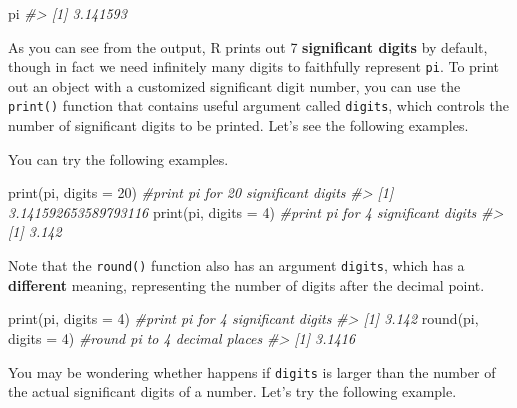 \documentclass[
]{book}
\newenvironment{Shaded}{\begin{snugshade}}{\end{snugshade}}
\newcommand{\AttributeTok}[1]{\textcolor[rgb]{0.77,0.63,0.00}{#1}}
\newcommand{\CommentTok}[1]{\textcolor[rgb]{0.56,0.35,0.01}{\textit{#1}}}
\newcommand{\DecValTok}[1]{\textcolor[rgb]{0.00,0.00,0.81}{#1}}
\newcommand{\FunctionTok}[1]{\textcolor[rgb]{0.00,0.00,0.00}{#1}}
\newcommand{\NormalTok}[1]{#1}
\newenvironment{blackbox}{
  \definecolor{shadecolor}{rgb}{0, 0, 0}  %
  \color{white}
  \begin{shaded}}
 {\end{shaded}}
\newenvironment{infobox}[1]
  {
  \begin{itemize}
  \renewcommand{\labelitemi}{
    \raisebox{-.7\height}[0pt][0pt]{
      {\setkeys{Gin}{width=3em,keepaspectratio}
        \texttt{[image: pics/\#1]}}
    }
  }
  \setlength{\fboxsep}{1em}
  \begin{blackbox}
  \item
  }
  {
  \end{blackbox}
  \end{itemize}
  }
\begin{document}
\begin{Shaded}
\begin{Highlighting}[]
\NormalTok{pi}
\CommentTok{\#\textgreater{} [1] 3.141593}
\end{Highlighting}
\end{Shaded}

As you can see from the output, R prints out 7 \textbf{significant digits} by default, though in fact we need infinitely many digits to faithfully represent \texttt{pi}. To print out an object with a customized significant digit number, you can use the \texttt{print()} function that contains useful argument called \texttt{digits}, which controls the number of significant digits to be printed. Let's see the following examples.

You can try the following examples.

\begin{Shaded}
\begin{Highlighting}[]
\FunctionTok{print}\NormalTok{(pi, }\AttributeTok{digits =} \DecValTok{20}\NormalTok{)          }\CommentTok{\#print pi for 20 significant digits}
\CommentTok{\#\textgreater{} [1] 3.141592653589793116}
\FunctionTok{print}\NormalTok{(pi, }\AttributeTok{digits =} \DecValTok{4}\NormalTok{)           }\CommentTok{\#print pi for 4 significant digits}
\CommentTok{\#\textgreater{} [1] 3.142}
\end{Highlighting}
\end{Shaded}

\begin{infobox}{caution}

Note that the \texttt{round()} function also has an argument \texttt{digits}, which has a \textbf{different} meaning, representing the number of digits after the decimal point.

\begin{Shaded}
\begin{Highlighting}[]
\FunctionTok{print}\NormalTok{(pi, }\AttributeTok{digits =} \DecValTok{4}\NormalTok{)           }\CommentTok{\#print pi for 4 significant digits}
\CommentTok{\#\textgreater{} [1] 3.142}
\FunctionTok{round}\NormalTok{(pi, }\AttributeTok{digits =} \DecValTok{4}\NormalTok{)           }\CommentTok{\#round pi to 4 decimal places}
\CommentTok{\#\textgreater{} [1] 3.1416}
\end{Highlighting}
\end{Shaded}

\end{infobox}

You may be wondering whether happens if \texttt{digits} is larger than the number of the actual significant digits of a number. Let's try the following example.
\end{document}
